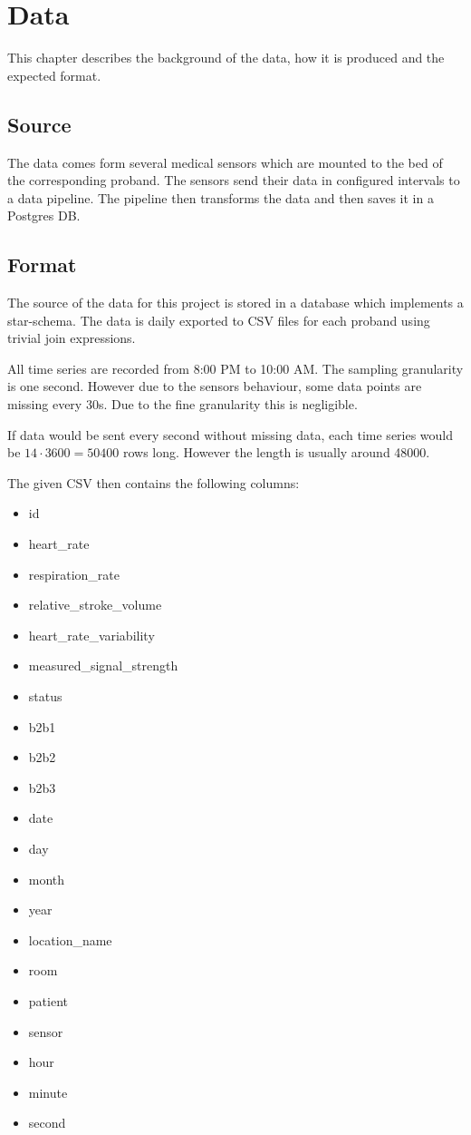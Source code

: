\chapter{Data}

This chapter describes the background of the data, how it is produced and the expected format.

\section{Source}
The data comes form several medical sensors which are mounted to the bed of the corresponding proband. The sensors send their data in configured intervals to a data pipeline. The pipeline then transforms the data and then saves it in a Postgres DB.

\section{Format}
\label{c:data_format}

The source of the data for this project is stored in a database which implements a star-schema. The data is daily exported to CSV files for each proband using trivial join expressions.

All time series are recorded from 8:00 PM to 10:00 AM.
The sampling granularity is one second. However due to the sensors behaviour, some data points are missing every 30s.
Due to the fine granularity this is negligible.

If data would be sent every second without missing data, each time series would be $14\cdot3600 = 50400$ rows long. However the length is usually around 48000.

\clearpage
The given CSV then contains the following columns:

\begin{multicols}{2}
\begin{itemize}
  \item id
  \item heart\_rate
  \item respiration\_rate
  \item relative\_stroke\_volume
  \item heart\_rate\_variability
  \item measured\_signal\_strength
  \item status
  \item b2b1
  \item b2b2
  \item b2b3
  \item date
  \item day
  \item month
  \item year
  \item location\_name
  \item room
  \item patient
  \item sensor
  \item hour
  \item minute
  \item second
\end{itemize}
\end{multicols}

